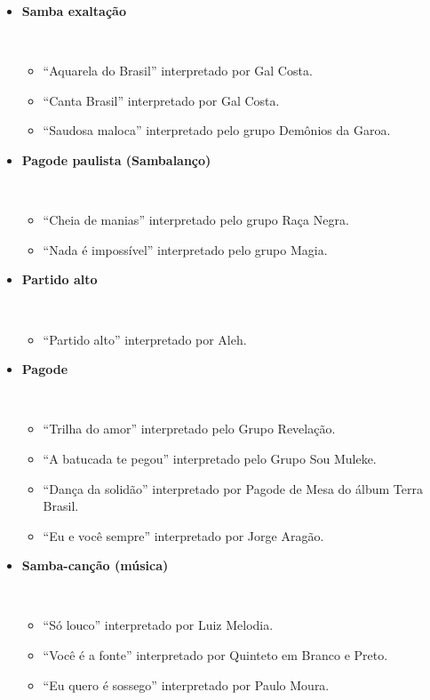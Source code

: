 \begin{itemize}
\item \textbf{Samba exaltação}
\begin{example} ~
\begin{itemize}
\item ``Aquarela do Brasil'' interpretado por Gal Costa.
\item ``Canta Brasil'' interpretado por Gal Costa.
\item ``Saudosa maloca'' interpretado pelo grupo Demônios da Garoa.
\end{itemize}
\end{example} 


\item \textbf{Pagode paulista (Sambalanço)}
\begin{example} ~
\begin{itemize}
\item ``Cheia de manias'' interpretado pelo grupo Raça Negra.
\item ``Nada é impossível'' interpretado pelo grupo Magia.
\end{itemize}
\end{example} 

\item \textbf{Partido alto}
\begin{example} ~
\begin{itemize}
\item ``Partido alto'' interpretado por Aleh.
\end{itemize}
\end{example} 

\item \textbf{Pagode}
\begin{example} ~
\begin{itemize}
\item ``Trilha do amor''  interpretado pelo Grupo Revelação. 
\item ``A batucada te pegou'' interpretado pelo Grupo Sou Muleke.
\item ``Dança da solidão'' interpretado por Pagode de Mesa do álbum Terra Brasil. 
\item ``Eu e você sempre'' interpretado por Jorge Aragão.
\end{itemize}
\end{example} 

\item \textbf{Samba-canção (música)}
\begin{example} ~
\begin{itemize}
\item ``Só louco'' interpretado por Luiz Melodia.
\item ``Você é a fonte'' interpretado por  Quinteto em Branco e Preto.
\item ``Eu quero é sossego'' interpretado por Paulo Moura.
\end{itemize}
\end{example} 


\end{itemize}
